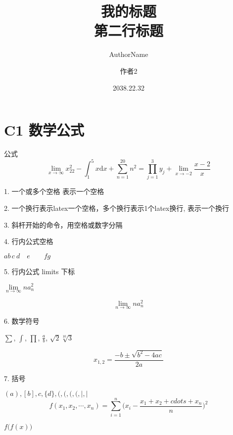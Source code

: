 \documentclass[UTF8]{ctexart}
\title{我的标题 \\ 第二行标题}
\author{AuthorName \and 作者2}
\date{2038.22.32}
\begin{document}
\maketitle

\tableofcontents

\section{C1 数学公式}
公式
\begin{equation}\lim_{x \to \infty} x^2_{22} - \int_{1}^{5}x\mathrm{d}x + \sum_{n=1}^{20} n^{2} = \prod_{j=1}^{3} y_{j}  + \lim_{x \to -2} \frac{x-2}{x}\end{equation}

1. 一个或多个空格    表示一个空格


2. 一个换行表示latex一个空格，多个换行表示1个latex换行,  表示一个換行


3. 斜杆开始的命令，用空格或数字分隔


4. 行内公式空格

$a b\, c\ d\quad e\qquad fg$

5. 行内公式 limits 下标


$\lim\limits_{n\to\infty}na_{n}^2$

\begin{equation}\label{eq:1}
  \lim_{n\to\infty}na_n^2
\end{equation}

6. 数学符号\newline

$\sum$, $\int$, $\prod$, $\frac{a}{b}$, $\sqrt{2}\sqrt[10]{3}$

\begin{equation}
  x_{1,2} = \frac{-b \pm \sqrt{b^2 - 4ac}}{2a}
\end{equation}

7. 括号

$(a),[b],{c},\{d\},\big(,\Big(,\bigg(,\Bigg(,\Bigg|, \Bigg|$
\begin{equation}
  f(x_1, x_2, \cdots, x_n) = \sum_{i = 1}^n
  \bigg(x_i - \frac{x_1 + x_2 + cdots + x_n}{n}\bigg)^2
\end{equation}

$f\big(f(x)\big)$
\end{document}
